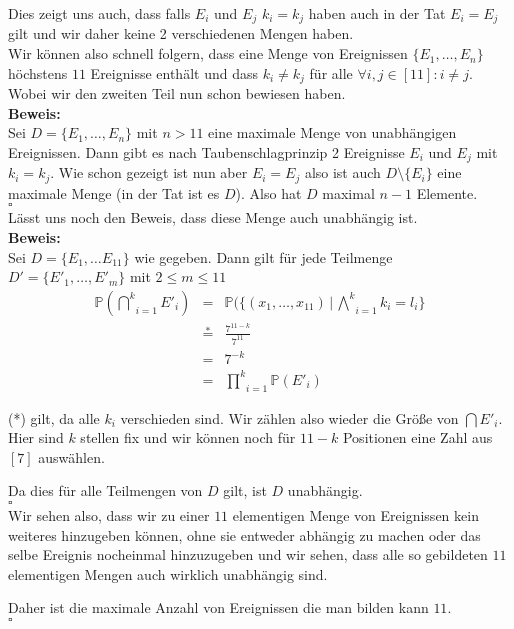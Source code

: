 \documentclass[11pt,a4paper,ngerman]{article}
\newcommand{\Prob}{\mathbb{P}}
\begin{document}
Dies zeigt uns auch, dass falls $E_i$ und $E_j$ $k_i = k_j$ haben auch in der Tat $E_i = E_j$ gilt und wir daher keine 2 verschiedenen Mengen haben.\\

Wir können also schnell folgern, dass eine Menge von Ereignissen $\{E_1, \ldots, E_n\}$ höchstens $11$ Ereignisse enthält und dass $k_i \not= k_j$
für alle $\forall i,j \in [11] : i \not= j$. Wobei wir den zweiten Teil nun schon bewiesen haben.\\

\textbf{Beweis:}\\
Sei $D = \{E_1, \ldots, E_{n} \}$ mit $n>11$ eine maximale Menge von unabhängigen Ereignissen. Dann gibt es nach Taubenschlagprinzip 2 Ereignisse $E_i$ und $E_j$ mit
$k_i = k_j$. Wie schon gezeigt ist nun aber $E_i = E_j$ also ist auch $D \setminus \{ E_i \}$ eine maximale Menge (in der Tat ist es $D$).
Also hat $D$ maximal $n-1$ Elemente.\\
\mbox{}\hfill$\square$\\

Lässt uns noch den Beweis, dass diese Menge auch unabhängig ist.\\
\textbf{Beweis:}\\
Sei $D = \{E_1, \ldots E_{11}\}$ wie gegeben. Dann gilt für jede Teilmenge $D' = \{E'_1, \ldots, E'_m\}$ mit $2\leq m \leq 11$
\[
    \begin{array}{rcl}
        \Prob(\underset{i=1}{\overset{k}{\bigcap}} E'_i) &=& \Prob(\{ (x_1, \ldots, x_{11}) \, | \, \underset{i=1}{\overset{k}{\bigwedge}} k_i = l_i\}\\
            &\stackrel{*}{=}& \frac{7^{11-k}}{7^11}\\
            &=& 7^{-k}\\
            &=& \underset{i=1}{\overset{k}{\prod}} \Prob(E'_i)
    \end{array}
\]

(*) gilt, da alle $k_i$ verschieden sind. Wir zählen also wieder die Größe von $\bigcap E'_i$. Hier sind $k$ stellen fix und wir können noch
für $11-k$ Positionen eine Zahl aus $[7]$ auswählen.

Da dies für alle Teilmengen von $D$ gilt, ist $D$ unabhängig.\\
\mbox{}\hfill$\square$\\


Wir sehen also, dass wir zu einer $11$ elementigen Menge von Ereignissen kein weiteres hinzugeben können, ohne sie entweder abhängig zu machen oder
das selbe Ereignis nocheinmal hinzuzugeben und wir sehen, dass alle so gebildeten $11$ elementigen Mengen auch wirklich unabhängig sind.

Daher ist die maximale Anzahl von Ereignissen die man bilden kann $11$.\\
\mbox{}\hfill$\square$

\label{LastPage}
\end{document}
